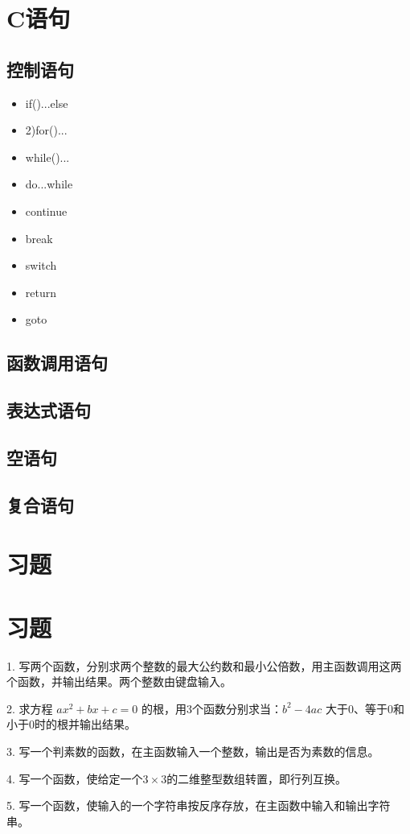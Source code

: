 \section{C语句}

\subsection{控制语句}
\begin{itemize}
	\item if()...else
	\item 2)for()...
	\item while()...
	\item do...while
	\item continue
	\item break
	\item switch
	\item return 
	\item goto
\end{itemize}
\subsection{函数调用语句}
\subsection{表达式语句}
\subsection{空语句}
\subsection{复合语句}

\section{习题}

\section{习题}

1. 写两个函数，分别求两个整数的最大公约数和最小公倍数，用主函数调用这两个函数，并输出结果。两个整数由键盘输入。

2. 求方程 $ax^2 + bx + c = 0$ 的根，用3个函数分别求当：$b^2 - 4ac$ 大于0、等于0和小于0时的根并输出结果。

3. 写一个判素数的函数，在主函数输入一个整数，输出是否为素数的信息。

4. 写一个函数，使给定一个$3 \times 3$的二维整型数组转置，即行列互换。

5. 写一个函数，使输入的一个字符串按反序存放，在主函数中输入和输出字符串。
